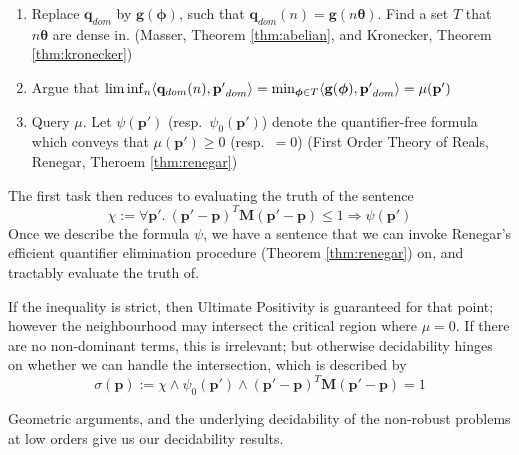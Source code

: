 \begin{enumerate}
\item Replace $\mathbf{q}_{dom}$ by $\mathbf{g}(\boldsymbol{\phi})$, such that $\mathbf{q}_{dom}(n) = \mathbf{g}(n\boldsymbol{\theta})$. Find a set $T$ that $n\boldsymbol\theta$ are dense in. (Masser, Theorem \ref{thm:abelian}, and Kronecker, Theorem \ref{thm:kronecker})
\item Argue that $\liminf_n  \langle\mathbf{q}_{dom}(n), \mathbf{p'}_{dom}\rangle = \min_{\boldsymbol{\phi} \in T} \langle\mathbf{g}(\boldsymbol{\phi}), \mathbf{p'}_{dom}\rangle  = \mu(\mathbf{p'})$
\item Query $\mu$. Let $\psi(\mathbf{p'})$ (resp.\ $\psi_0(\mathbf{p'})$) denote the quantifier-free formula which conveys that $\mu(\mathbf{p'}) \ge 0$ (resp.\ $=0$) (First Order Theory of Reals, Renegar, Theroem \ref{thm:renegar})
\end{enumerate}
The first task then reduces to evaluating the truth of the sentence 
\begin{equation}
\label{eq:firsttask}
\chi := \forall \mathbf{p'}.~ (\mathbf{p'} - \mathbf{p})^T\mathbf{M}(\mathbf{p'} - \mathbf{p}) \le 1 \Rightarrow \psi(\mathbf{p'})
\end{equation}
Once we describe the formula $\psi$, we have a sentence that we can invoke Renegar's efficient quantifier elimination procedure (Theorem \ref{thm:renegar}) on, and tractably evaluate the truth of.

If the inequality is strict, then Ultimate Positivity is guaranteed for that point; however the neighbourhood may intersect the critical region where $\mu = 0$. If there are no non-dominant terms, this is irrelevant; but otherwise decidability hinges on whether we can handle the intersection, which is described by 
\begin{equation}
\label{eq:intersection}
\sigma(\mathbf{p}):= \chi \land \psi_0(\mathbf{p'}) \land (\mathbf{p'} - \mathbf{p})^T\mathbf{M}(\mathbf{p'} - \mathbf{p}) = 1
\end{equation}

Geometric arguments, and the underlying decidability of the non-robust problems at low orders \cite{joeljames3} give us our decidability results.

